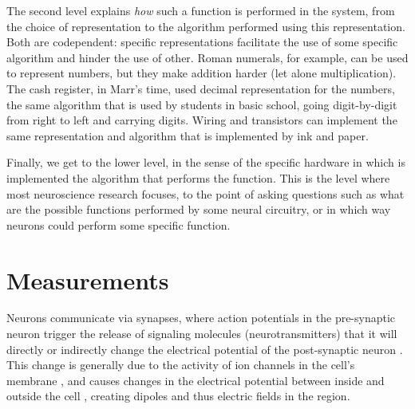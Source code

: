         The second level explains \textit{how} such a function is performed in the system, from the choice of representation to the algorithm performed using this representation. Both are codependent: specific representations facilitate the use of some specific algorithm and hinder the use of other. Roman numerals, for example, can be used to represent numbers, but they make addition harder (let alone multiplication). The cash register, in Marr's time, used decimal representation for the numbers, the same algorithm that is used by students in basic school, going digit-by-digit from right to left and carrying digits. Wiring and transistors can implement the same representation and algorithm that is implemented by ink and paper.
        
        Finally, we get to the lower level, in the sense of the specific hardware in which is implemented the algorithm that performs the function. This is the level where most neuroscience research focuses, to the point of asking questions such as what are the possible functions performed by some neural circuitry, or in which way neurons could perform some specific function.
    
        
        
        
        

\section{Measurements}
    Neurons communicate via synapses, where action potentials in the pre-synaptic neuron trigger the release of signaling molecules (neurotransmitters) that it will directly or indirectly change the electrical potential of the post-synaptic neuron \cite{purves2014neuroscience}. This change is generally due to the activity of ion channels in the cell's membrane \cite{purves2014neuroscience}, and causes changes in the electrical potential between inside and outside the cell \cite{purves2014neuroscience}, creating dipoles and thus electric fields in the region.
    
